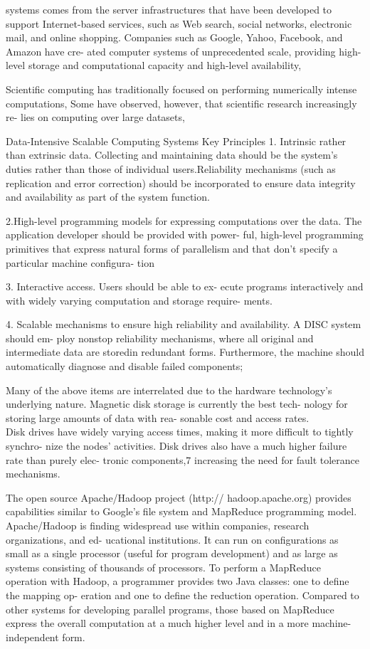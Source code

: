 systems comes from the server infrastructures that have been developed to support Internet-based services, such as Web search, social networks, electronic mail, and online shopping. Companies such as Google, Yahoo, Facebook, and Amazon have cre- ated computer systems of unprecedented scale, providing high-level storage and computational capacity and high-level availability, 
 
Scientific computing has traditionally focused on performing numerically intense computations, Some have observed, however, that scientific research increasingly re- lies on computing over large datasets,


Data-Intensive Scalable Computing Systems
Key Principles
1. Intrinsic rather than extrinsic data. Collecting and maintaining data should be the system’s duties rather than those of individual users.Reliability mechanisms (such as replication and error correction) should be incorporated to ensure data integrity and availability as part of the system function.

2.High-level programming models for expressing computations over the data. The application developer should be provided with power- ful, high-level programming primitives that 
express natural forms of parallelism and that don’t specify a particular machine configura- tion 


3. Interactive access. Users should be able to ex- ecute programs interactively and with widely varying computation and storage require- ments. 

4. Scalable mechanisms to ensure high reliability and availability. A DISC system should em- ploy nonstop reliability mechanisms, where all original and intermediate data are storedin redundant forms. Furthermore, the machine should automatically diagnose and disable failed components;

Many of the above items are interrelated due to the hardware technology’s underlying nature. Magnetic disk storage is currently the best tech- nology for storing large amounts of data with rea- sonable cost and access rates. \\
Disk drives have widely varying access times, making it more difficult to tightly synchro- nize the nodes’ activities. 
Disk drives also have a much higher failure rate than purely elec- tronic components,7 increasing the need for fault tolerance mechanisms.

The open source Apache/Hadoop project (http:// hadoop.apache.org) provides capabilities similar to Google’s file system and MapReduce programming model. Apache/Hadoop is finding widespread use within companies, research organizations, and ed- ucational institutions. It can run on configurations as small as a single processor (useful for program development) and as large as systems consisting of thousands of processors. To perform a MapReduce operation with Hadoop, a programmer provides
two Java classes: one to define the mapping op- eration and one to define the reduction operation. Compared to other systems for developing parallel programs, those based on MapReduce express the overall computation at a much higher level and in a more machine-independent form.

